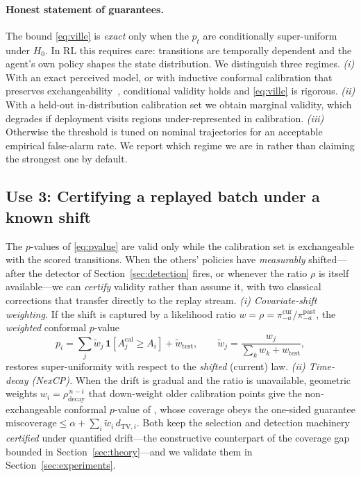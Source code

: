 \documentclass[sigconf]{aamas}
\newcommand{\picur}{\pi^{\mathrm{cur}}_{-a}}
\newcommand{\pipast}{\pi^{\mathrm{past}}_{-a}}
\newcommand{\indic}[1]{\mathbf{1}\!\left[#1\right]}
\begin{document}
\paragraph{Honest statement of guarantees.} The bound \eqref{eq:ville} is
\emph{exact} only when the $p_t$ are conditionally super-uniform under $H_0$. In
RL this requires care: transitions are temporally dependent and the agent's own
policy shapes the state distribution. We distinguish three regimes. \emph{(i)}
With an exact perceived model, or with inductive conformal calibration that
preserves exchangeability~\cite{volkhonskiy2017inductive}, conditional validity
holds and \eqref{eq:ville} is rigorous. \emph{(ii)} With a held-out
in-distribution calibration set we obtain marginal validity, which degrades if
deployment visits regions under-represented in calibration. \emph{(iii)}
Otherwise the threshold is tuned on nominal trajectories for an acceptable
empirical false-alarm rate. We report which regime we are in rather than claiming
the strongest one by default.

\subsection{Use 3: Certifying a replayed batch under a known shift}
\label{sec:certified}
The $p$-values of \eqref{eq:pvalue} are valid only while the calibration set is
exchangeable with the scored transitions. When the others' policies have
\emph{measurably} shifted---after the detector of Section~\ref{sec:detection}
fires, or whenever the ratio $\rho$ is itself available---we can \emph{certify}
validity rather than assume it, with two classical corrections that transfer
directly to the replay stream. \emph{(i) Covariate-shift weighting.} If the shift
is captured by a likelihood ratio $w=\rho=\picur/\pipast$, the \emph{weighted}
conformal $p$-value~\cite{tibshirani2019conformal}
\begin{equation}
\label{eq:weighted-p}
p_i=\sum_{j}\tilde w_j\,\indic{A^{\mathrm{cal}}_j\ge A_i}+\tilde w_{\mathrm{test}},
\qquad
\tilde w_j=\frac{w_j}{\textstyle\sum_k w_k+w_{\mathrm{test}}},
\end{equation}
restores super-uniformity with respect to the \emph{shifted} (current) law.
\emph{(ii) Time-decay (NexCP).} When the drift is gradual and the ratio is
unavailable, geometric weights $w_i=\rho_{\mathrm{decay}}^{\,n-i}$ that
down-weight older calibration points give the non-exchangeable conformal
$p$-value of \citet{barber2023beyond}, whose coverage obeys the one-sided
guarantee $\text{miscoverage}\le\alpha+\sum_i\tilde w_i\,d_{\mathrm{TV},i}$. Both keep the
selection and detection machinery \emph{certified} under quantified drift---the
constructive counterpart of the coverage gap bounded in
Section~\ref{sec:theory}---and we validate them in Section~\ref{sec:experiments}.
\end{document}
